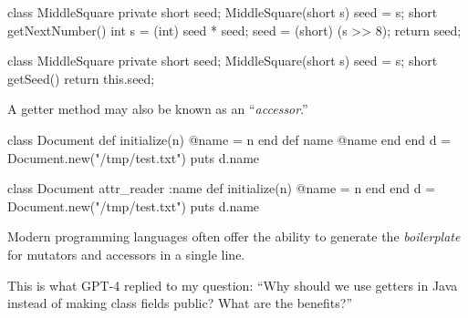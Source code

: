 \documentclass{article}
\begin{document}

\pptToc


\begin{pptWide}{2}
{\small\begin{ffcode}
class MiddleSquare {
  private short seed;
  MiddleSquare(short s) { seed = s; }
  short getNextNumber() {
    int s = (int) seed * seed;
    seed = (short) (s >> 8);
    return seed;
  }
}
\end{ffcode}
}
\par\columnbreak\par
{\small\begin{ffcode}
class MiddleSquare {
  private short seed;
  MiddleSquare(short s) { seed = s; }
  short getSeed() {
    return this.seed;
  }
}
\end{ffcode}
}
\end{pptWide}
\par
A getter method may also be known as an ``\emph{accessor}.''
\plush{}

\begin{pptWide}{2}
{\small\begin{ffcode}
class Document
  def initialize(n)
    @name = n
  end
  def name
    @name
  end
end
d = Document.new("/tmp/test.txt")
puts d.name
\end{ffcode}
}
\par\columnbreak\par
{\small\begin{ffcode}
class Document
  attr_reader :name
  def initialize(n)
    @name = n
  end
end
d = Document.new("/tmp/test.txt")
puts d.name
\end{ffcode}
}
\end{pptWide}
\par
Modern programming languages often offer the ability to generate the \emph{boilerplate} for mutators and accessors in a single line.
\plush{}

\begin{pptWide}{2}
\par\columnbreak\par
{}
\end{pptWide}
\par
This is what GPT-4 replied to my question: ``Why should we use getters in Java instead of making class fields public? What are the benefits?''
\plush{}
\end{document}
